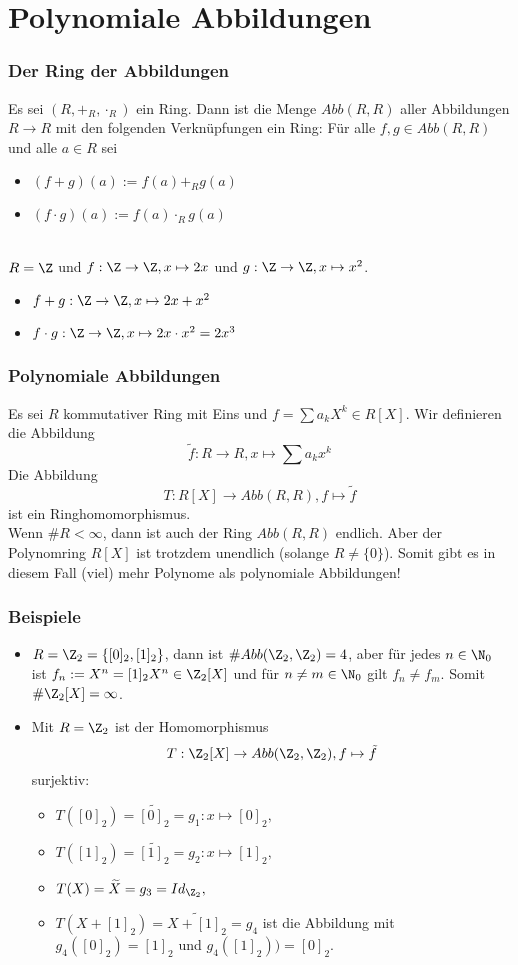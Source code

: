 \section{Polynomiale Abbildungen}
%
\begin{frame}\frametitle{Der Ring der Abbildungen}
Es sei $(R,+_R,\cdot_R)$ ein Ring. Dann ist die Menge $Abb(R,R)$ aller Abbildungen $R \to R$ mit den folgenden Verknüpfungen ein Ring: Für alle $f,g \in Abb(R,R)$ und alle $a\in R$ sei
\begin{itemize}
\item $(f+g)(a):=f(a)+_Rg(a)$
\item $(f\cdot g)(a):=f(a)\cdot_Rg(a)$
\end{itemize} \pause\vfill
{}\\
$R=\Z$ und $f:\Z \to \Z, x \mapsto 2x$ und $g:\Z \to \Z, x \mapsto x^2$. \pause
\begin{itemize}
\item $f+g : \Z \to \Z, x \mapsto 2x+x^2$ \pause
\item $f\cdot g: \Z \to \Z, x\mapsto 2x \cdot x^2=2x^3$
\end{itemize}
\end{frame}
%
%
\begin{frame}\frametitle{Polynomiale Abbildungen}
Es sei $R$ kommutativer Ring mit Eins und $f=\sum a_kX^k \in R[X]$. Wir definieren die Abbildung
$$
\tilde f: R \to R, x \mapsto \sum a_kx^k
$$\pause
Die Abbildung
$$
T: R[X] \to Abb(R,R), f \mapsto \tilde f
$$
ist ein Ringhomomorphismus. \pause
\vfill
{}\\
Wenn $\#R< \infty$, dann ist auch der Ring $Abb(R,R)$ endlich. Aber der Polynomring $R[X]$ ist trotzdem unendlich (solange $R\ne\{0\}$). Somit gibt es in diesem Fall (viel) mehr Polynome als polynomiale Abbildungen!
\end{frame}
%
%
\begin{frame}\frametitle{Beispiele}
\begin{itemize}
\item $R=\Z_2=\{[0]_2,[1]_2\}$, dann ist $\#Abb(\Z_2,\Z_2)=4$, \pause aber für jedes $n \in \N_0$ ist $f_n:=X^n=[1]_2X^n \in \Z_2[X]$ und für $n\ne m\in \N_0$ gilt $f_n \ne f_m$. \pause Somit $\#\Z_2[X] = \infty$.\pause

\item Mit $R=\Z_2$ ist der Homomorphismus
$$
T: \Z_2[X] \to Abb(\Z_2,\Z_2), f \mapsto \tilde f
$$
surjektiv: \pause
\begin{itemize}
\item $T([0]_2)=\widetilde{[0]_2} =g_1:x \mapsto [0]_2,$\pause
\item $T([1]_2)=\widetilde{[1]_2} =g_2:x \mapsto [1]_2,$\pause
\item $T(X)=\widetilde{X} =g_3=Id_{\Z_2},$ \pause
\item $T(X+[1]_2)=\widetilde{X+[1]_2} =g_4$ ist die Abbildung mit $g_4([0]_2)=[1]_2$ und $g_4([1]_2))=[0]_2$.
\end{itemize}
\end{itemize}
\end{frame}
